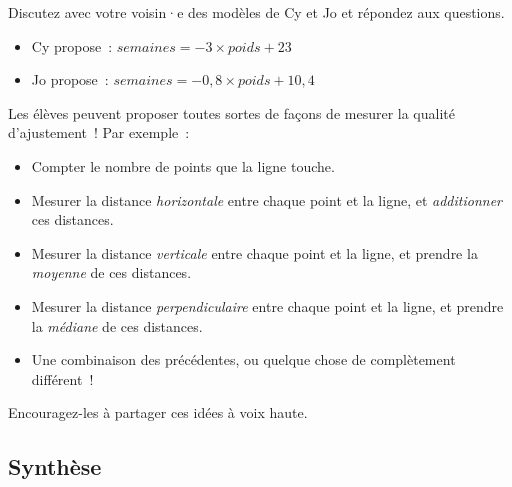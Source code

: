 \documentclass[12pt,a4paper]{article}
\begin{document}
\begin{activitybox}
  Discutez avec votre voisin·e des modèles de Cy et Jo et répondez aux questions.

  \begin{itemize}
    \item Cy propose~: $semaines = -3 \times poids + 23$
    \item Jo propose~: $semaines = -0{,}8 \times poids + 10{,}4$
  \end{itemize}

  Les élèves peuvent proposer toutes sortes de façons de mesurer la qualité d'ajustement~! Par exemple~:
  \begin{itemize}
    \item Compter le nombre de points que la ligne touche.
    \item Mesurer la distance \emph{horizontale} entre chaque point et la ligne, et \emph{additionner} ces distances.
    \item Mesurer la distance \emph{verticale} entre chaque point et la ligne, et prendre la \emph{moyenne} de ces distances.
    \item Mesurer la distance \emph{perpendiculaire} entre chaque point et la ligne, et prendre la \emph{médiane} de ces distances.
    \item Une combinaison des précédentes, ou quelque chose de complètement différent~!
  \end{itemize}

  Encouragez-les à partager ces idées à voix haute.
\end{activitybox}

\subsection{Synthèse}
\end{document}
